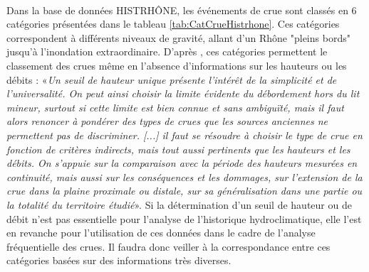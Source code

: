 	\paragraph{} Dans la base de données HISTRHÔNE, les événements de crue sont classés en 6 catégories présentées dans le tableau \ref{tab:CatCrueHistrhone}. Ces catégories correspondent à différents niveaux de gravité, allant d'un Rhône "pleins bords" jusqu'à l'inondation extraordinaire. D'après \citet{pichard_sept_2014}, ces catégories permettent le classement des crues même en l'absence d'informations sur les hauteurs ou les débits : «\textit{Un seuil de hauteur unique présente l'intérêt de la simplicité et de l'universalité. On peut ainsi choisir la limite évidente du débordement hors du lit mineur, surtout si cette limite est bien connue et sans ambiguïté, mais il faut alors renoncer à pondérer des types de crues que les sources anciennes ne permettent pas de discriminer. [...] il faut se résoudre à choisir le type de crue en fonction de critères indirects, mais tout aussi pertinents que les hauteurs et les débits. On s'appuie sur la comparaison avec la période des hauteurs mesurées en continuité, mais aussi sur les conséquences et les dommages, sur l'extension de la crue dans la plaine proximale ou distale, sur sa généralisation dans une partie ou la totalité du territoire étudié}». Si la détermination d'un seuil de hauteur ou de débit n'est pas essentielle pour l'analyse de l'historique hydroclimatique, elle l'est en revanche pour l'utilisation de ces données dans le cadre de l'analyse fréquentielle des crues.  Il faudra donc veiller à la correspondance entre ces catégories basées sur des informations très diverses.
	
